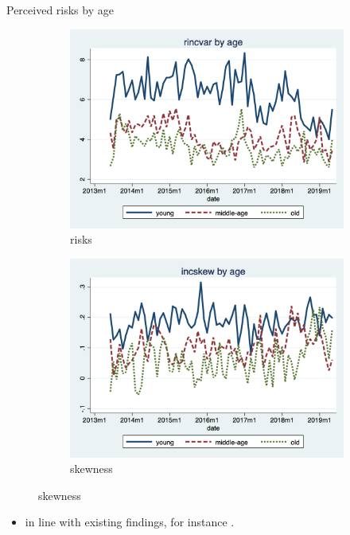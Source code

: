 \documentclass{beamer}
\begin{document}
\begin{frame}{Perceived risks by age}
	\begin{figure}[ht]
		\label{ts_incvar_age_g_mean}
		\begin{subfigure}[b]{0.46\textwidth}
			\centering
			\caption{risks}
			\includegraphics[width=\textwidth, height = 0.33\textheight]{figures/ts_rincvar_age_g_median.png}
		\end{subfigure}
		\begin{subfigure}[b]{0.46\textwidth}
			\caption{skewness}
			\includegraphics[width=\textwidth, height = 0.33\textheight]{figures/ts_incskew_age_g_mean.png}
	\end{subfigure}
	\end{figure}
\begin{itemize}
	\item in line with existing findings, for instance  
	\cite{bloom2018great}. 
\end{itemize}
 \end{frame}
\end{document}
